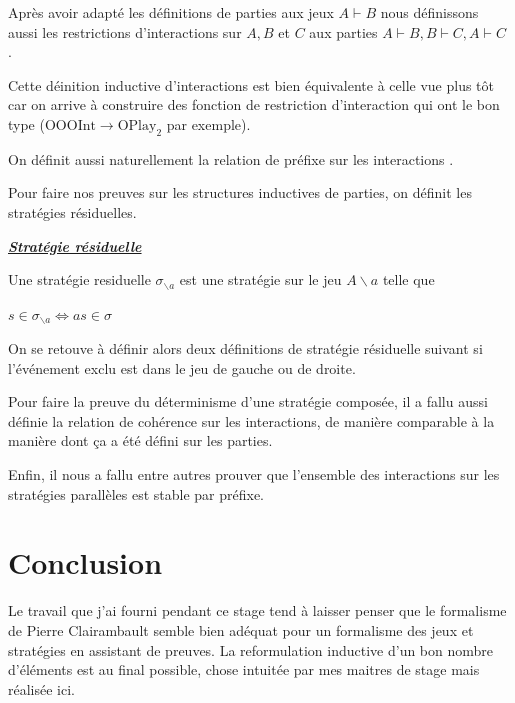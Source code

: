 \documentclass[a4paper,12pt]{article}
\renewenvironment{leftbar}{
  \def\FrameCommand{\vrule width 1pt \hspace{10pt}}
  \MakeFramed {\advance\hsize-\width \FrameRestore}
\setlength{\parskip}{10pt}}
 {\endMakeFramed}
\newenvironment{answer}[1]
{
  \vspace{0.5cm} \noindent \begin{minipage}{\linewidth}
    \textbf{\textit{\uline{#1}}}
    \begin{leftbar}
}
{
    \end{leftbar}\end{minipage}\vspace{0.2cm}
}
\begin{document}
Après avoir adapté les définitions de parties aux jeux $A\vdash B$
nous définissons aussi les restrictions d'interactions sur $A, B$ et $C$
aux parties $A\vdash B, B\vdash C, A\vdash C$ \href{https://ulysse_durand.gitlab.io/stagel3/Codecoq.theories.interactions.html\#restriction\_lm\_OOO}{\faCode}.

Cette déinition inductive d'interactions est bien équivalente à celle vue
plus tôt car on arrive à construire des fonction de restriction d'interaction
qui ont le bon type ($\text{OOOInt} \rightarrow \text{OPlay}_2$ par exemple).

On définit aussi naturellement la relation de préfixe sur les interactions \href{https://ulysse_durand.gitlab.io/stagel3/Codecoq.theories.interactions.html\#prefixOOO}{\faCode}.

Pour faire nos preuves sur les structures inductives de parties,
on définit les stratégies résiduelles.

\begin{answer}{Stratégie résiduelle \href{https://ulysse_durand.gitlab.io/stagel3/Codecoq.theories.residustrat.html\#residu\_stratO\_l}{\faCode}}
Une stratégie residuelle $\sigma_{\backslash a}$ est une stratégie sur le jeu
$A\backslash a$ telle que

$s \in \sigma_{\backslash a} \iff as \in \sigma$
\end{answer}
On se retouve à définir alors deux définitions de stratégie résiduelle suivant si
l'événement exclu est dans le jeu de gauche ou de droite.

Pour faire la preuve du déterminisme d'une stratégie composée, il a fallu aussi
définie la relation de cohérence sur les interactions, de manière comparable à
la manière dont ça a été défini sur les parties. \href{https://ulysse_durand.gitlab.io/stagel3/Codecoq.theories.interactions.html\#CohOOO}{\faCode}

Enfin, il nous a fallu entre autres prouver que l'ensemble des interactions sur les
stratégies parallèles est stable par préfixe. \href{https://ulysse_durand.gitlab.io/stagel3/Codecoq.theories.compose.html\#prefixe\_donc\_paralleleOO}{\faCode}

\newpage
\section{Conclusion}

Le travail que j'ai fourni pendant ce stage tend à laisser penser que le
formalisme de Pierre Clairambault semble bien adéquat pour un formalisme des
jeux et stratégies en assistant de preuves.
La reformulation inductive d'un bon nombre d'éléments est au final possible,
chose intuitée par mes maitres de stage mais réalisée ici.
\end{document}
